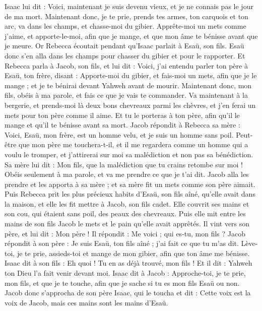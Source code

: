 \begin{multicols}{2}
Isaac lui dit : Voici, maintenant je suis devenu vieux, et je ne connais pas le jour de ma mort.
Maintenant donc, je te prie, prends tes armes, ton carquois et ton arc, va dans les champs, et chasse-moi du gibier.
Apprête-moi un mets comme j’aime, et apporte-le-moi, afin que je mange, et que mon âme te bénisse avant que je meure.
Or Rebecca écoutait pendant qu'Isaac parlait à Esaü, son fils. Esaü donc s'en alla dans les champs pour chasser du gibier et pour le rapporter.
Et Rebecca parla à Jacob, son fils, et lui dit : Voici, j'ai entendu parler ton père à Esaü, ton frère, disant :
Apporte-moi du gibier, et fais-moi un mets, afin que je le mange ; et je te bénirai devant Yahweh avant de mourir.
Maintenant donc, mon fils, obéis à ma parole, et fais ce que je vais te commander.
Va maintenant à la bergerie, et prends-moi là deux bons chevreaux parmi les chèvres, et j'en ferai un mets pour ton père comme il aime.
Et tu le porteras à ton père, afin qu'il le mange et qu'il te bénisse avant sa mort.
Jacob répondit à Rebecca sa mère : Voici, Esaü, mon frère, est un homme velu, et je suis un homme sans poil.
Peut-être que mon père me touchera-t-il, et il me regardera comme un homme qui a voulu le tromper, et j'attirerai sur moi sa malédiction et non pas sa bénédiction.
Sa mère lui dit : Mon fils, que la malédiction que tu crains retombe sur moi ! Obéis seulement à ma parole, et va me prendre ce que je t'ai dit.
Jacob alla les prendre et les apporta à sa mère ; et sa mère fit un mets comme son père aimait.
Puis Rebecca prit les plus précieux habits d'Esaü, son fils aîné, qu'elle avait dans la maison, et elle les fit mettre à Jacob, son fils cadet.
Elle couvrit ses mains et son cou, qui étaient sans poil, des peaux des chevreaux.
Puis elle mit entre les mains de son fils Jacob le mets et le pain qu'elle avait apprêtés.
Il vint vers son père, et lui dit : Mon père ! Il répondit : Me voici ; qui es-tu, mon fils ?
Jacob répondit à son père : Je suis Esaü, ton fils aîné ; j'ai fait ce que tu m’as dit. Lève-toi, je te prie, assieds-toi et mange de mon gibier, afin que ton âme me bénisse.
Isaac dit à son fils : Eh quoi ! Tu en as déjà trouvé, mon fils ! Et il dit : Yahweh ton Dieu l'a fait venir devant moi.
Isaac dit à Jacob : Approche-toi, je te prie, mon fils, et que je te touche, afin que je sache si tu es mon fils Esaü ou non.
Jacob donc s'approcha de son père Isaac, qui le toucha et dit : Cette voix est la voix de Jacob, mais ces mains sont les mains d'Esaü.

\end{multicols}

